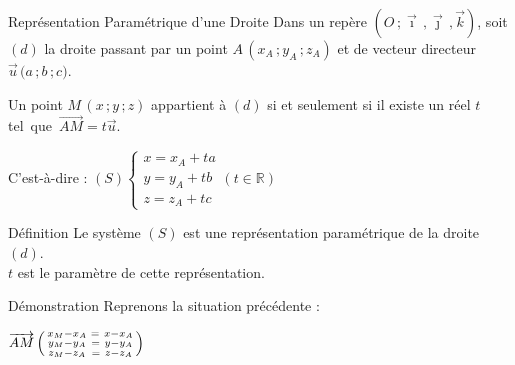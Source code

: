 \documentclass{coursbook}
\begin{document}
    \begin{Gpartie}{Représentation Paramétrique d'une Droite} 
        Dans un repère $\left(O\,;\vec{\imath}\,,\vec{\jmath}\,,\vec{k}\right)$, soit $(d)$ la droite passant par un point $A\,\left(x_A\,; y_A\,; z_A\right)$ et de vecteur directeur $\vec{u}\,\big(a\,; b\,; c\big)$.

        Un point $M\,\left(x\,; y\,; z\right)$ appartient à $(d)$ si et seulement si il existe un réel $t$ tel~que~$\overrightarrow{AM}=t\vec{u}$.

        C'est-à-dire : $(S)\begin{cases} x=x_A+ta \\ y=y_A+tb \\ z=z_A+tc \end{cases}\left(t\in\mathbb{R}\right)$

        \begin{Spartie}{Définition} 
            Le système $(S)$ est une représentation paramétrique de la droite $(d)$. \\ $t$ est le paramètre de cette représentation.
            \begin{SSpartie}{Démonstration}
                Reprenons la situation précédente :
                
                $\overrightarrow{AM}\,\begin{psmallmatrix} x_M-x_A &=\ x-x_A \\ y_M-y_A &=\ y-y_A \\ z_M-z_A &=\ z-z_A \end{psmallmatrix}$


\end{SSpartie}
\end{Spartie}
\end{Gpartie}
\end{document}
